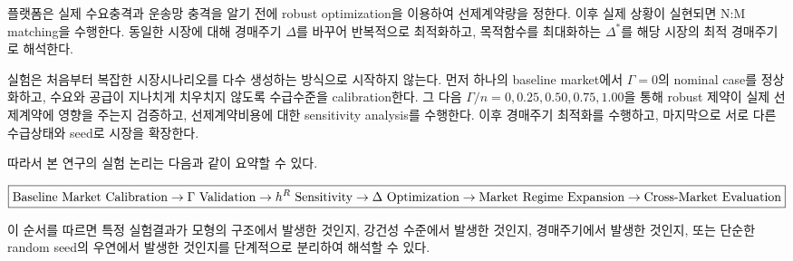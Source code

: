 \documentclass[11pt,a4paper]{article}
\begin{document}
플랫폼은 실제 수요충격과 운송망 충격을 알기 전에
robust optimization을 이용하여 선제계약량을 정한다.
이후 실제 상황이 실현되면 N:M matching을 수행한다.
동일한 시장에 대해 경매주기 $\Delta$를 바꾸어 반복적으로 최적화하고,
목적함수를 최대화하는 $\Delta^*$를 해당 시장의 최적 경매주기로 해석한다.

실험은 처음부터 복잡한 시장시나리오를 다수 생성하는 방식으로 시작하지 않는다.
먼저 하나의 baseline market에서 $\Gamma=0$의 nominal case를 정상화하고,
수요와 공급이 지나치게 치우치지 않도록 수급수준을 calibration한다.
그 다음 $\Gamma/n=0,0.25,0.50,0.75,1.00$을 통해 robust 제약이 실제 선제계약에 영향을 주는지 검증하고,
선제계약비용에 대한 sensitivity analysis를 수행한다.
이후 경매주기 최적화를 수행하고,
마지막으로 서로 다른 수급상태와 seed로 시장을 확장한다.

따라서 본 연구의 실험 논리는 다음과 같이 요약할 수 있다.

\[
\boxed{
\text{Baseline Market Calibration}
\rightarrow
\Gamma\text{ Validation}
\rightarrow
h^R\text{ Sensitivity}
\rightarrow
\Delta\text{ Optimization}
\\
\rightarrow
\text{Market Regime Expansion}
\rightarrow
\text{Cross-Market Evaluation}
}
\]

이 순서를 따르면 특정 실험결과가 모형의 구조에서 발생한 것인지,
강건성 수준에서 발생한 것인지,
경매주기에서 발생한 것인지,
또는 단순한 random seed의 우연에서 발생한 것인지를 단계적으로 분리하여 해석할 수 있다.
\end{document}
